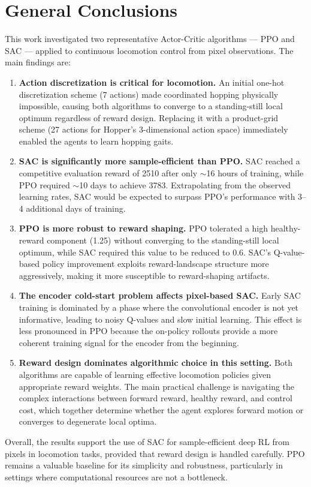 \documentclass[onecolumn]{cwpreport} %
\begin{document}
\section{General Conclusions}
\label{sec:conclusions}

This work investigated two representative Actor-Critic algorithms — PPO and SAC — applied to continuous locomotion control from pixel observations. The main findings are:

\begin{enumerate}
    \item \textbf{Action discretization is critical for locomotion.} An initial one-hot discretization scheme (7 actions) made coordinated hopping physically impossible, causing both algorithms to converge to a standing-still local optimum regardless of reward design. Replacing it with a product-grid scheme (27 actions for Hopper's 3-dimensional action space) immediately enabled the agents to learn hopping gaits.

    \item \textbf{SAC is significantly more sample-efficient than PPO.} SAC reached a competitive evaluation reward of 2510 after only $\sim$16 hours of training, while PPO required $\sim$10 days to achieve 3783. Extrapolating from the observed learning rates, SAC would be expected to surpass PPO's performance with 3--4 additional days of training.

    \item \textbf{PPO is more robust to reward shaping.} PPO tolerated a high healthy-reward component (1.25) without converging to the standing-still local optimum, while SAC required this value to be reduced to 0.6. SAC's Q-value-based policy improvement exploits reward-landscape structure more aggressively, making it more susceptible to reward-shaping artifacts.

    \item \textbf{The encoder cold-start problem affects pixel-based SAC.} Early SAC training is dominated by a phase where the convolutional encoder is not yet informative, leading to noisy Q-values and slow initial learning. This effect is less pronounced in PPO because the on-policy rollouts provide a more coherent training signal for the encoder from the beginning.

    \item \textbf{Reward design dominates algorithmic choice in this setting.} Both algorithms are capable of learning effective locomotion policies given appropriate reward weights. The main practical challenge is navigating the complex interactions between forward reward, healthy reward, and control cost, which together determine whether the agent explores forward motion or converges to degenerate local optima.
\end{enumerate}

Overall, the results support the use of SAC for sample-efficient deep RL from pixels in locomotion tasks, provided that reward design is handled carefully. PPO remains a valuable baseline for its simplicity and robustness, particularly in settings where computational resources are not a bottleneck.
\newpage


\end{document}
